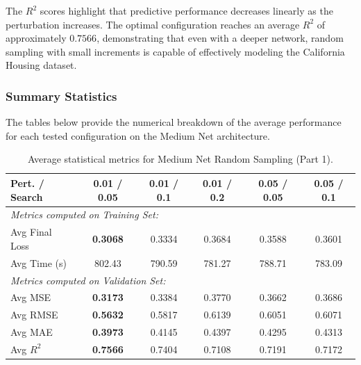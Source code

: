The $R^2$ scores highlight that predictive performance decreases linearly as the perturbation increases. The optimal configuration reaches an average $R^2$ of approximately $0.7566$, demonstrating that even with a deeper network, random sampling with small increments is capable of effectively modeling the California Housing dataset.

\subsubsection{Summary Statistics}

The tables below provide the numerical breakdown of the average performance for each tested configuration on the Medium Net architecture.

\begin{table}[h]
\centering
\scriptsize
\begin{tabular}{|l|c|c|c|c|c|}
\hline
\textbf{Pert. / Search} & \textbf{0.01 / 0.05} & \textbf{0.01 / 0.1} & \textbf{0.01 / 0.2} & \textbf{0.05 / 0.05} & \textbf{0.05 / 0.1} \\ \hline
\multicolumn{6}{|l|}{\textit{Metrics computed on Training Set:}} \\ \hline
Avg Final Loss & \textbf{0.3068} & 0.3334 & 0.3684 & 0.3588 & 0.3601 \\ \hline
Avg Time (s)   & 802.43 & 790.59 & 781.27 & 788.71 & 783.09 \\ \hline
\multicolumn{6}{|l|}{\textit{Metrics computed on Validation Set:}} \\ \hline
Avg MSE        & \textbf{0.3173} & 0.3384 & 0.3770 & 0.3662 & 0.3686 \\ \hline
Avg RMSE       & \textbf{0.5632} & 0.5817 & 0.6139 & 0.6051 & 0.6071 \\ \hline
Avg MAE        & \textbf{0.3973} & 0.4145 & 0.4397 & 0.4295 & 0.4313 \\ \hline
Avg $R^2$      & \textbf{0.7566} & 0.7404 & 0.7108 & 0.7191 & 0.7172 \\ \hline
\end{tabular}
\caption{Average statistical metrics for Medium Net Random Sampling (Part 1).}
\label{tab:medium_net_random_part1}
\end{table}

